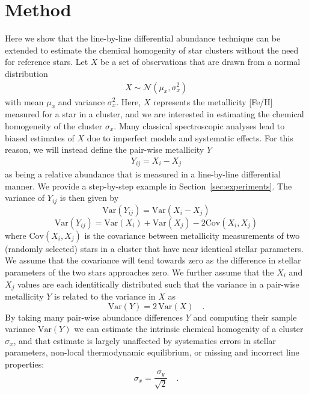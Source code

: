 \documentclass[modern]{aastex631}
\begin{document}
\section{Method} \label{sec:method}
Here we show that the line-by-line differential abundance technique can be extended to estimate the chemical homogenity of star clusters without the need for reference stars. Let ${X}$ be a set of observations that are drawn from a normal distribution
\begin{eqnarray}
   X \sim \mathcal{N}(\mu_x, \sigma_x^2)
\end{eqnarray}
\noindent{}with mean $\mu_x$ and variance $\sigma_x^2$. Here, $X$ represents the metallicity [Fe/H] measured for a star in a cluster, and we are interested in estimating the chemical homogeneity of the cluster $\sigma_x$. Many classical spectroscopic analyses lead to biased estimates of $X$ due to imperfect models and systematic effects. For this reason, we will instead define the pair-wise metallicity $Y$
\begin{eqnarray}
    Y_{ij} = X_i - X_j
\end{eqnarray}
\noindent{}as being a relative abundance that is measured in a line-by-line differential manner. We provide a step-by-step example in Section~\ref{sec:experiments}. The variance of $Y_{ij}$ is then given by
\begin{equation}
    \mathrm{Var}(Y_{ij}) = \mathrm{Var}(X_i - X_j)
\end{equation}
\begin{equation}
    \mathrm{Var}(Y_{ij}) = \mathrm{Var}(X_i) + \mathrm{Var}(X_j) - 2\mathrm{Cov}(X_i,X_j)
\end{equation}
\noindent{}where $\mathrm{Cov}(X_i,X_j)$ is the covariance between metallicity measurements of two (randomly selected) stars in a cluster that have near identical stellar parameters. We assume that the covariance will tend towards zero as the difference in stellar parameters of the two stars approaches zero. We further assume that the $X_i$ and $X_j$ values are each identitically distributed such that the variance in a pair-wise metallicity $Y$ is related to the variance in $X$ as
\begin{equation}
    \mathrm{Var}(Y) = 2\,\mathrm{Var}(X) \quad .
\end{equation}
By taking many pair-wise abundance differences $Y$ and computing their sample variance $\mathrm{Var}(Y)$ we can estimate the intrinsic chemical homogenity of a cluster $\sigma_{x}$, and that estimate is largely unaffected by systematics errors in stellar parameters, non-local thermodynamic equilibrium, or missing and incorrect line properties:
\begin{equation}
    \sigma_x = \frac{\sigma_y}{\sqrt{2}} \quad .
    \label{eq:sigma_x_to_sigma_y}
\end{equation}
\end{document}
